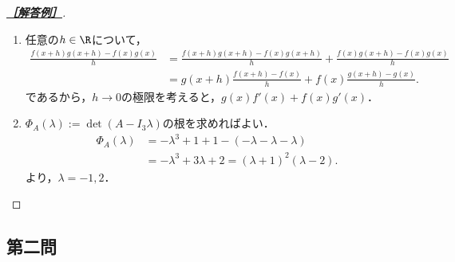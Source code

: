 \documentclass[uplatex,dvipdfmx]{jsarticle}
\begin{document}
\begin{proof}[\textbf{\underline{［解答例］}}]
\begin{enumerate}
\begin{enumerate}
        \end{enumerate}
        \item 任意の$h\in\R$について，
        \begin{align*}
            \frac{f(x+h)g(x+h)-f(x)g(x)}{h}&=\frac{f(x+h)g(x+h)-f(x)g(x+h)}{h}+\frac{f(x)g(x+h)-f(x)g(x)}{h}\\
            &=g(x+h)\frac{f(x+h)-f(x)}{h}+f(x)\frac{g(x+h)-g(x)}{h}.
        \end{align*}
        であるから，$h\to0$の極限を考えると，$g(x)f'(x)+f(x)g'(x)$．
        \item $\Phi_A(\lambda):=\det(A-I_3\lambda)$の根を求めればよい．
        \begin{align*}
            \Phi_A(\lambda)&=-\lambda^3+1+1-(-\lambda-\lambda-\lambda)\\
            &=-\lambda^3+3\lambda+2=(\lambda+1)^2(\lambda-2).
        \end{align*}
        より，$\lambda=-1,2$．
    \end{enumerate}
\end{proof}

\subsection{第二問}
\end{document}
